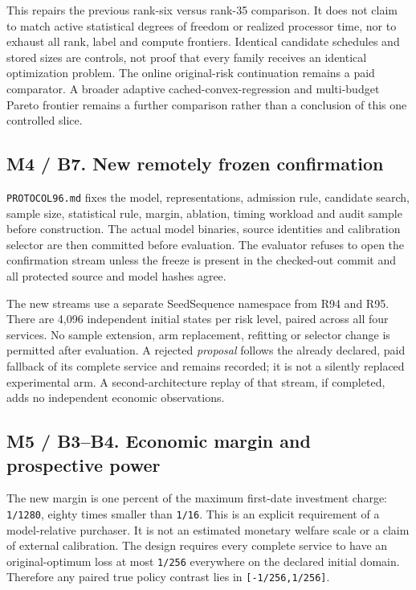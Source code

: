 This repairs the previous rank-six versus rank-35 comparison. It does
not claim to match active statistical degrees of freedom or realized
processor time, nor to exhaust all rank, label and compute frontiers.
Identical candidate schedules and stored sizes are controls, not proof
that every family receives an identical optimization problem. The online
original-risk continuation remains a paid comparator. A broader adaptive
cached-convex-regression and multi-budget Pareto frontier remains a
further comparison rather than a conclusion of this one controlled
slice.

\hypertarget{m4-b7.-new-remotely-frozen-confirmation}{%
\subsection{M4 / B7. New remotely frozen
confirmation}\label{m4-b7.-new-remotely-frozen-confirmation}}

\texttt{PROTOCOL96.md} fixes the model, representations, admission rule,
candidate search, sample size, statistical rule, margin, ablation,
timing workload and audit sample before construction. The actual model
binaries, source identities and calibration selector are then committed
before evaluation. The evaluator refuses to open the confirmation stream
unless the freeze is present in the checked-out commit and all protected
source and model hashes agree.

The new streams use a separate SeedSequence namespace from R94 and R95.
There are 4,096 independent initial states per risk level, paired across
all four services. No sample extension, arm replacement, refitting or
selector change is permitted after evaluation. A rejected
\emph{proposal} follows the already declared, paid fallback of its
complete service and remains recorded; it is not a silently replaced
experimental arm. A second-architecture replay of that stream, if
completed, adds no independent economic observations.

\hypertarget{m5-b3b4.-economic-margin-and-prospective-power}{%
\subsection{M5 / B3--B4. Economic margin and prospective
power}\label{m5-b3b4.-economic-margin-and-prospective-power}}

The new margin is one percent of the maximum first-date investment
charge: \texttt{1/1280}, eighty times smaller than \texttt{1/16}. This
is an explicit requirement of a model-relative purchaser. It is not an
estimated monetary welfare scale or a claim of external calibration. The
design requires every complete service to have an original-optimum loss
at most \texttt{1/256} everywhere on the declared initial domain.
Therefore any paired true policy contrast lies in
\texttt{{[}-1/256,1/256{]}}.

